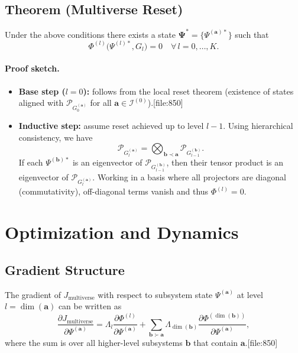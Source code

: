 \documentclass[12pt]{article}
\begin{document}
\subsection{Theorem (Multiverse Reset)}

Under the above conditions there exists a state
$\bm{\Psi}^* = \{\Psi^{(\bm{a})*}\}$ such that
\[
\Phi^{(l)}\big(\Psi^{(l)*}, G_l\big) = 0
\quad \forall\, l = 0,\dots,K.
\]

\paragraph{Proof sketch.}
\begin{itemize}
  \item \textbf{Base step ($l=0$):} follows from the local reset theorem
        (existence of states aligned with $\mathcal{P}_{G_0^{(\bm{a})}}$ for all $\bm{a} \in \mathcal{I}^{(0)}$).[file:850]
  \item \textbf{Inductive step:} assume reset achieved up to level $l-1$.
    Using hierarchical consistency, we have
    \[
    \mathcal{P}_{G_l^{(\bm{a})}} =
    \bigotimes_{\bm{b} \prec \bm{a}}
    \mathcal{P}_{G_{l-1}^{(\bm{b})}}.
    \]
    If each $\Psi^{(\bm{b})*}$ is an eigenvector of $\mathcal{P}_{G_{l-1}^{(\bm{b})}}$,
    then their tensor product is an eigenvector of $\mathcal{P}_{G_l^{(\bm{a})}}$.
    Working in a basis where all projectors are diagonal (commutativity),
    off-diagonal terms vanish and thus $\Phi^{(l)} = 0$.
\end{itemize}

\section{Optimization and Dynamics}

\subsection{Gradient Structure}

The gradient of $J_{\text{multiverse}}$ with respect to subsystem state
$\Psi^{(\bm{a})}$ at level $l = \dim(\bm{a})$ can be written as
\[
\frac{\partial J_{\text{multiverse}}}{\partial \Psi^{(\bm{a})}} =
\Lambda_l
\frac{\partial \Phi^{(l)}}{\partial \Psi^{(\bm{a})}}
+
\sum_{\bm{b} \succ \bm{a}}
\Lambda_{\dim(\bm{b})}
\frac{\partial \Phi^{(\dim(\bm{b}))}}{\partial \Psi^{(\bm{a})}},
\]
where the sum is over all higher-level subsystems $\bm{b}$ that contain $\bm{a}$.[file:850]
\end{document}
